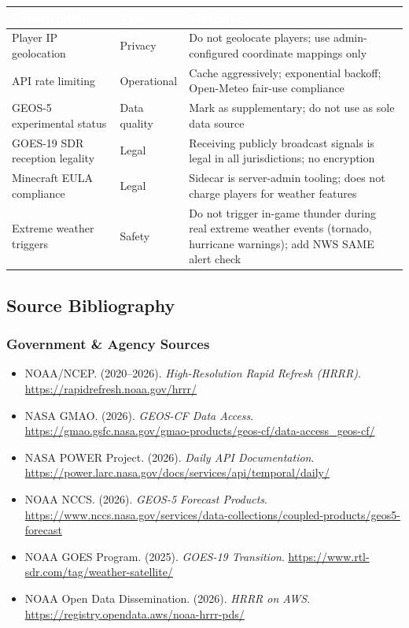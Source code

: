 \documentclass[11pt,letterpaper]{article}
\newcommand{\tableheader}[1]{\textbf{\sffamily\textcolor{white}{#1}}}
\begin{document}
\begin{center}
\begin{tabularx}{\textwidth}{L{3.5cm}L{2cm}X}
\toprule
{}
\tableheader{Consideration} & \tableheader{Type} & \tableheader{Mitigation} \\
\midrule
Player IP geolocation & Privacy & Do not geolocate players; use admin-configured coordinate mappings only \\
API rate limiting & Operational & Cache aggressively; exponential backoff; Open-Meteo fair-use compliance \\
GEOS-5 experimental status & Data quality & Mark as supplementary; do not use as sole data source \\
GOES-19 SDR reception legality & Legal & Receiving publicly broadcast signals is legal in all jurisdictions; no encryption \\
Minecraft EULA compliance & Legal & Sidecar is server-admin tooling; does not charge players for weather features \\
Extreme weather triggers & Safety & Do not trigger in-game thunder during real extreme weather events (tornado, hurricane warnings); add NWS SAME alert check \\
\bottomrule
\end{tabularx}
\end{center}

\subsection{Source Bibliography}

\subsubsection{Government \& Agency Sources}
\begin{itemize}[noitemsep]
  \item NOAA/NCEP. (2020--2026). \textit{High-Resolution Rapid Refresh (HRRR)}. \url{https://rapidrefresh.noaa.gov/hrrr/}
  \item NASA GMAO. (2026). \textit{GEOS-CF Data Access}. \url{https://gmao.gsfc.nasa.gov/gmao-products/geos-cf/data-access\_geos-cf/}
  \item NASA POWER Project. (2026). \textit{Daily API Documentation}. \url{https://power.larc.nasa.gov/docs/services/api/temporal/daily/}
  \item NOAA NCCS. (2026). \textit{GEOS-5 Forecast Products}. \url{https://www.nccs.nasa.gov/services/data-collections/coupled-products/geos5-forecast}
  \item NOAA GOES Program. (2025). \textit{GOES-19 Transition}. \url{https://www.rtl-sdr.com/tag/weather-satellite/}
  \item NOAA Open Data Dissemination. (2026). \textit{HRRR on AWS}. \url{https://registry.opendata.aws/noaa-hrrr-pds/}
\end{itemize}
\end{document}
